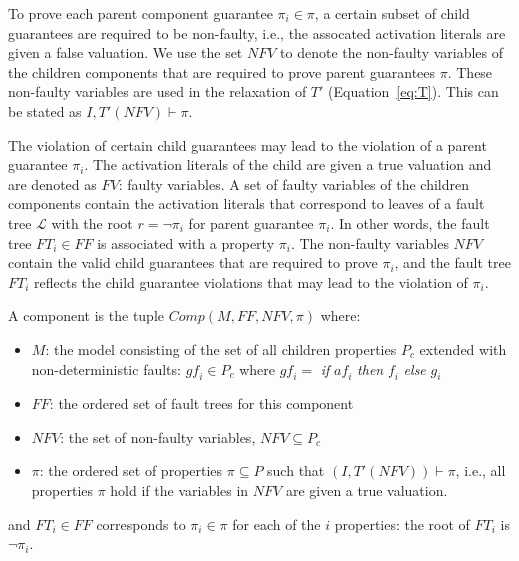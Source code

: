 
To prove each parent component guarantee $\pi_i \in \pi$, a certain subset of child guarantees are required to be non-faulty, i.e., the assocated activation literals are given a false valuation. We use the set $\mathit{NFV}$ to denote the non-faulty variables of the children components that are required to prove parent guarantees $\pi$.  These non-faulty variables are used in the relaxation of $T'$ (Equation~\ref{eq:T}). This can be stated as $I,T'(\mathit{NFV}) \vdash \pi$. 

The violation of certain child guarantees may lead to the violation of a parent guarantee $\pi_i$. The activation literals of the child are given a true valuation and are denoted as $\mathit{FV}$: faulty variables. A set of faulty variables of the children components contain the activation literals that correspond to leaves of a fault tree $\mathcal{L}$ with the root $r = \neg \pi_i$ for parent guarantee $\pi_i$. In other words, the fault tree $\mathit{FT_i} \in \mathit{FF}$ is associated with a property $\pi_i$. The non-faulty variables $\mathit{NFV}$ contain the valid child guarantees that are required to prove $\pi_i$, and the fault tree $\mathit{FT_i}$ reflects the child guarantee violations that may lead to the violation of $\pi_i$.


\begin{definition}
A component is the tuple $\mathit{Comp}(M, \mathit{FF}, \mathit{NFV}, \pi)$ where:
\begin{itemize}[label=\textbullet]
\item $M$: the model consisting of the set of all children properties $P_c$ extended with non-deterministic faults: $\mathit{gf_i} \in P_c$ where $\mathit{gf_i} =$ \textit{if} $\mathit{af_i}$ \textit{then} $\mathit{f}_i$ \textit{else} $g_i$
\item $\mathit{FF}$: the ordered set of fault trees for this component
\item $\mathit{NFV}$: the set of non-faulty variables, $\mathit{NFV} \subseteq P_c$
\item $\pi$: the ordered set of properties $\pi \subseteq P$ such that $(I, T'(\mathit{NFV})) \vdash \pi$, i.e., all properties $\pi$ hold if the variables in $\mathit{NFV}$ are given a true valuation.
\end{itemize}
and $\mathit{FT}_i \in \mathit{FF}$ corresponds to $\pi_i \in \pi$ for each of the $i$ properties: the root of $\mathit{FT_i}$ is $\neg \pi_i$. 
\end{definition}


